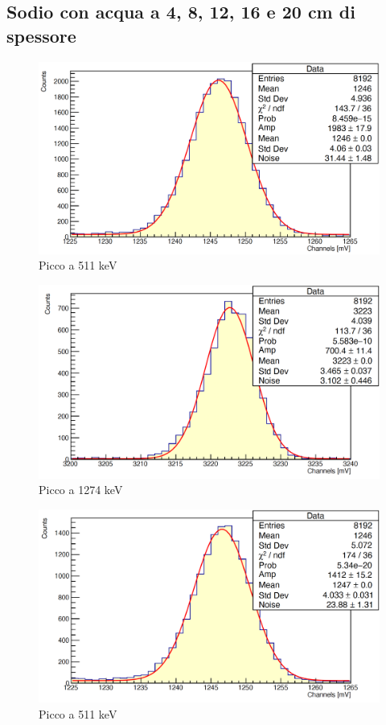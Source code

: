 \documentclass[a4paper,10pt]{article}
\begin{document}
\subsection{Sodio con acqua a 4, 8, 12, 16 e 20 cm di spessore}
\begin{figure}[H]
    \centering
    \includegraphics[scale=0.45]{appendice/spettri/NaA1_4}
    \caption{Picco a 511 keV}
\end{figure}
\begin{figure}[H]
    \centering
    \includegraphics[scale=0.45]{appendice/spettri/NaA2_4}
    \caption{Picco a 1274 keV}
\end{figure}
\begin{figure}[H]
    \centering
    \includegraphics[scale=0.45]{appendice/spettri/NaA1_8}
    \caption{Picco a 511 keV}
\end{figure}
\end{document}
